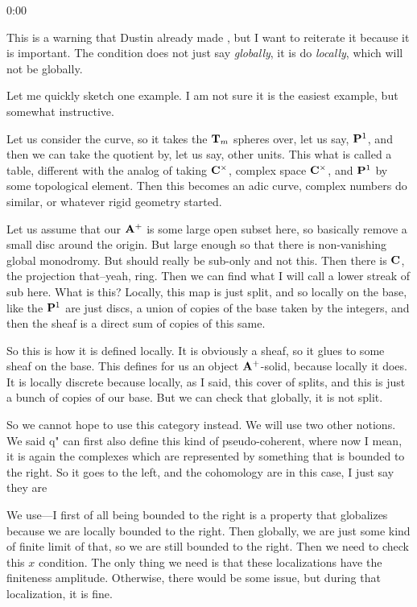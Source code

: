 \begin{unfinished}{0:00}
{\begin{theorem}
\begin{warning}
This is a warning that Dustin already made , but I want to reiterate it because it is important. The condition does not just say \emph{globally}, it is do \emph{locally}, which will not be globally. 

Let me quickly sketch one example. I am not sure it is the easiest example, but somewhat instructive.

%
Let us consider the curve, so it takes the $\T_m$ spheres over, let us say, $\P^1$, and then we can take the quotient by, let us say, other units. 
This what is called a table, different with the analog of taking $\C^\times$, complex space $\C^\times$, and $\P^1$ by some topological element. 
Then this becomes an adic curve, complex numbers do similar, or whatever rigid geometry started. 


Let us assume that our $\A^+$ is some large open subset here, so basically remove a small disc around the origin. But large enough so that there is non-vanishing global monodromy. But should really be sub-only and not this. 
% 
Then there is $\C$, the projection that--yeah, ring. Then we can find what I will call a lower streak of sub here. 
What is this? Locally, this map is just split, and so locally on the base, like the $\P^1$ are just discs, a union of copies of the base taken by the integers, and then the sheaf is a direct sum of copies of this same. 

So this is how it is defined locally. It is obviously a sheaf, so it glues to some sheaf on the base. This defines for us an object $\A^+$-solid, because locally it does. It is locally discrete because locally, as I said, this cover of splits, and this is just a bunch of copies of our base. But we can check that globally, it is not split.

\end{warning}

%
So we cannot hope to use this category instead. We will use two other notions. We said q" can first also define this kind of pseudo-coherent, where now I mean, it is again the complexes which are represented by something that is bounded to the right. So it goes to the left, and the cohomology are in this case, I just say they are

%
We use---I first of all being bounded to the right is a property that globalizes because we are locally bounded to the right. Then globally, we are just some kind of finite limit of that, so we are still bounded to the right. Then we need to check this $x$ condition. The only thing we need is that these localizations have the finiteness amplitude. 
Otherwise, there would be some issue, but during that localization, it is fine.


\end{theorem}}
\end{unfinished}
